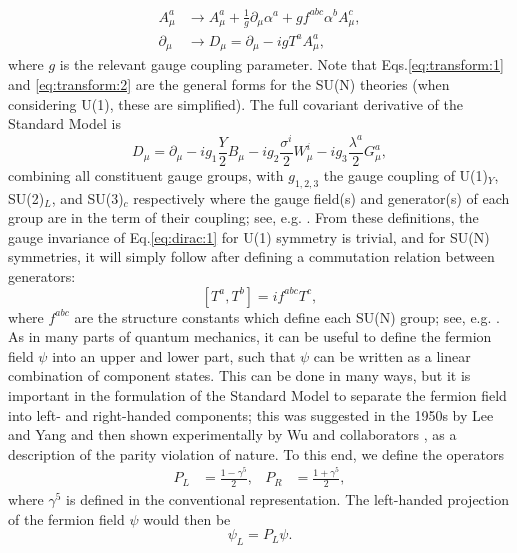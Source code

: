 \documentclass[a4paper,12pt]{article}
\begin{document}
\begin{align}
    \label{eq:transform:1}
    A^a_\mu &\to A^a_\mu + \frac{1}{g}\partial_\mu\alpha^a + gf^{abc}\alpha^bA^c_\mu, \\
    \label{eq:transform:2}
    \partial_\mu &\to D_\mu = \partial_\mu - igT^aA^a_\mu,
\end{align}
where $g$ is the relevant gauge coupling parameter.
Note that Eqs.\eqref{eq:transform:1} and \eqref{eq:transform:2} are the general forms for the SU(N) theories (when considering U(1), these are simplified).
The full covariant derivative of the Standard Model is
\begin{equation}
    \label{eq:covar}
    D_\mu = \partial_\mu - ig_1\frac{Y}{2}B_\mu - ig_2\frac{\sigma^i}{2}W^i_\mu - ig_3\frac{\lambda^a}{2}G^a_\mu,
\end{equation}
combining all constituent gauge groups, with $g_{1,2,3}$ the gauge coupling of U(1)$_Y$, SU(2)$_L$, and SU(3)$_c$ respectively where the gauge field(s) and generator(s) of each group are in the term of their coupling; see, e.g. \cite{kane}.   
From these definitions, the gauge invariance of Eq.\eqref{eq:dirac:1} for U(1) symmetry is trivial, and for SU(N) symmetries, it will simply follow after defining a commutation relation between generators:
\begin{equation}
    \label{eq:commute}
    [T^a,T^b] = if^{abc}T^c,
\end{equation}
where $f^{abc}$ are the structure constants which define each SU(N) group; see, e.g. \cite{bail}. 
As in many parts of quantum mechanics, it can be useful to define the fermion field $\psi$ into an upper and lower part, such that $\psi$ can be written as a linear combination of component states. 
This can be done in many ways, but it is important in the formulation of the Standard Model to separate the fermion field into left- and right-handed components; this was suggested in the 1950s by Lee and Yang \cite{lee} and then shown experimentally by Wu and collaborators \cite{wu}, as a description of the parity violation of nature. 
To this end, we define the operators
\begin{align}
    \label{eq:helix}
    P_L &= \frac{1-\gamma^5}{2}, & P_R &= \frac{1+\gamma^5}{2},
\end{align}
where $\gamma^5$ is defined in the conventional representation. 
The left-handed projection of the fermion field $\psi$ would then be
\begin{equation}
    \label{eq:projection}
    \psi_L = P_L\psi.
\end{equation}
\end{document}
